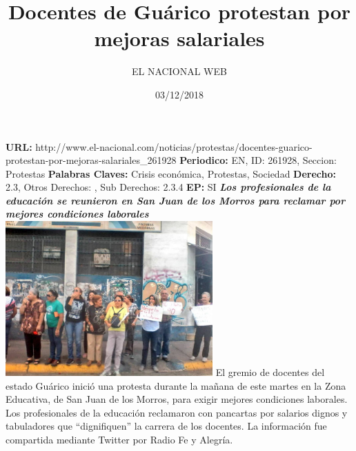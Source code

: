 \documentclass{article}%
\title{\textbf{Docentes de Guárico protestan por mejoras salariales}}%
\author{EL NACIONAL WEB}%
\date{03/12/2018}%
\begin{document}
%
\normalsize%
\maketitle%
\textbf{URL: }%
http://www.el{-}nacional.com/noticias/protestas/docentes{-}guarico{-}protestan{-}por{-}mejoras{-}salariales\_261928\newline%
%
\textbf{Periodico: }%
EN, %
ID: %
261928, %
Seccion: %
Protestas\newline%
%
\textbf{Palabras Claves: }%
Crisis económica, Protestas, Sociedad\newline%
%
\textbf{Derecho: }%
2.3, %
Otros Derechos: %
, %
Sub Derechos: %
2.3.4\newline%
%
\textbf{EP: }%
SI\newline%
\newline%
%
\textbf{\textit{Los profesionales de la educación se reunieron en San Juan de los Morros para reclamar por mejores condiciones laborales~}}%
\newline%
\newline%
%
\includegraphics[width=300px]{55.jpg}%
\newline%
%
El gremio de docentes del estado Guárico inició una protesta durante la mañana de este martes en la Zona Educativa, de San Juan de los Morros, para exigir mejores condiciones laborales.%
\newline%
%
Los profesionales de la educación reclamaron con pancartas por salarios dignos y tabuladores que “dignifiquen” la carrera de los docentes.%
\newline%
%
La información fue compartida mediante Twitter por Radio Fe y Alegría.%
\newline%
%
\end{document}
